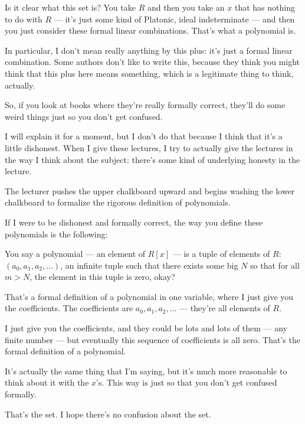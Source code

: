\begin{speech}[01:20:48 - 01:22:05]
Is it clear what this set is? You take $R$ and then you take an $x$ that has nothing to do with $R$ --- it's just some kind of Platonic, ideal indeterminate --- and then you just consider these formal linear combinations. That's what a polynomial is.

In particular, I don't mean really anything by this plus: it's just a formal linear combination. Some authors don't like to write this, because they think you might think that this plus here means something, which is a legitimate thing to think, actually.

So, if you look at books where they're really formally correct,  they'll do some weird things just so you don't get confused.

I will explain it for a moment, but I don't do that because I think that it's a little dishonest. When I give these lectures, I try to actually give the lectures in the way I think about the subject: there's some kind of underlying honesty in the lecture.
\end{speech}

\begin{note}
The lecturer pushes the upper chalkboard upward and begins washing the lower chalkboard to formalize the rigorous definition of polynomials.
\end{note}

\begin{speech}[01:22:05 - 01:23:58]
If I were to be dishonest and formally correct, the way you define these polynomials is the following:

You say a polynomial --- an element of $R[x]$  --- is a tuple of elements of $R$: $(a_0, a_1, a_2, \dots)$,  an infinite tuple such that there exists some big $N$ so that for all $m > N$, the element in this tuple is zero, okay? 

That's a formal definition of a polynomial in one variable, where I just give you the coefficients. The coefficients are $a_0, a_1, a_2, \dots$ --- they're all elements of $R$. 

I just give you the coefficients, and they could be lots and lots of them --- any finite number --- but eventually this sequence of coefficients is all zero. That's the formal definition of a polynomial.

It's actually the same thing that I'm saying, but it's much more reasonable to think about it with the $x$'s. This way is just so that you don't get confused formally.

That's the set. I hope there's no confusion about the set.
\end{speech}

